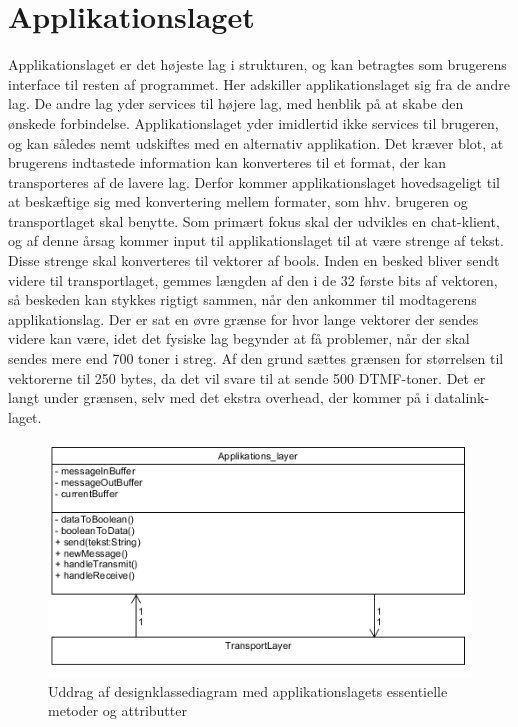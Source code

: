 \section{Applikationslaget}
Applikationslaget er det højeste lag i strukturen, og kan betragtes som brugerens interface til resten af programmet. Her adskiller applikationslaget sig fra de andre lag. De andre lag yder services til højere lag, med henblik på at skabe den ønskede forbindelse. Applikationslaget yder imidlertid ikke services til brugeren, og kan således nemt udskiftes med en alternativ applikation. Det kræver blot, at brugerens indtastede information kan konverteres til et format, der kan transporteres af de lavere lag.
	Derfor kommer applikationslaget hovedsageligt til at beskæftige sig med konvertering mellem formater, som hhv. brugeren og transportlaget skal benytte. Som primært fokus skal der udvikles en chat-klient, og af denne årsag kommer input til applikationslaget til at være strenge af tekst. Disse strenge skal konverteres til vektorer af bools. Inden en besked bliver sendt videre til transportlaget, gemmes længden af den i de 32 første bits af vektoren, så beskeden kan stykkes rigtigt sammen, når den ankommer til modtagerens applikationslag. Der er sat en øvre grænse for hvor lange vektorer der sendes videre kan være, idet det fysiske lag begynder at få problemer, når der skal sendes mere end 700 toner i streg. Af den grund sættes grænsen for størrelsen til vektorerne til 250 bytes, da det vil svare til at sende 500 DTMF-toner. Det er langt under grænsen, selv med det ekstra overhead, der kommer på i datalink-laget.
	
	
\begin{figure}[h]
\centering
\includegraphics[scale=0.6]{Billeder/ApplicationLayerDesignClass.PNG}
\caption{Uddrag af designklassediagram med applikationslagets essentielle metoder og attributter}
\label{fig:AppLayerDesign}
\end{figure}
	

